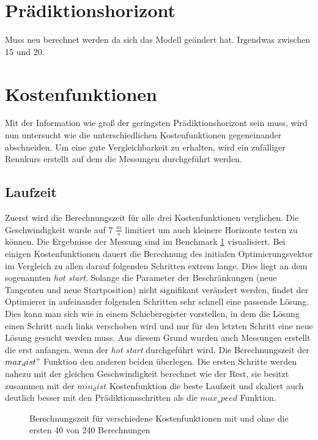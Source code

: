 \documentclass{like}
\begin{document}
\section{Prädiktionshorizont} 
Muss neu berechnet werden da sich das Modell geändert hat. Irgendwas zwischen 15 und 20.

\section{Kostenfunktionen}
Mit der Information wie groß der geringsten Prädiktionshorizont sein muss, wird nun untersucht wie die unterschiedlichen Kostenfunktionen gegeneinander abschneiden. Um eine gute Vergleichbarkeit zu erhalten, wird ein zufälliger Rennkurs erstellt auf dem die Messungen durchgeführt werden. 

\subsection{Laufzeit}
Zuerst wird die Berechnungszeit für alle drei Kostenfunktionen verglichen. 
Die Geschwindigkeit wurde auf 7 $\frac{m}{s}$ limitiert um auch kleinere Horizonte testen zu können. Die Ergebnisse der Messung sind im Benchmark \ref{fig:computeCost} visualisiert. Bei einigen Kostenfunktionen dauert die  Berechnung des initialen Optimierungsvektor im Vergleich zu allen darauf folgenden Schritten extrem lange. Dies liegt an dem sogenannten \emph{hot start}. Solange die Parameter der Beschränkungen (neue Tangenten und neue Startposition) nicht signifikant verändert werden, findet der Optimierer in aufeinander folgenden Schritten sehr schnell eine passende Lösung. Dies kann man sich wie in einem Schieberegister vorstellen, in dem die Lösung einen Schritt nach links verschoben wird und nur für den letzten Schritt eine neue Lösung gesucht werden muss. Aus diesem Grund wurden auch Messungen erstellt die erst anfangen, wenn der \emph{hot start} durchgeführt wird. Die Berechnungszeit der $max_dist"$ Funktion den anderen beiden überlegen. Die ersten Schritte werden nahezu mit der gleichen Geschwindigkeit berechnet wie der Rest, sie besitzt zusammen mit der $min_dist$ Kostenfunktion die beste Laufzeit und skaliert auch deutlich besser mit den Prädiktionsschritten als die $max_speed$ Funktion.


\begin{figure}
	\centering
	 
	\caption{Berechnungszeit für verschiedene Kostenfunktionen mit und ohne die ersten 40 von 240 Berechnungen}
	\label{fig:computeCost}
\end{figure}
\end{document}

